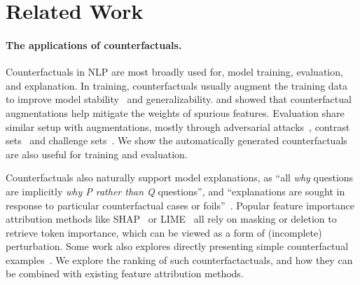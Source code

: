 \section{Related Work}
\label{sec:relate}

\paragraph{The applications of counterfactuals.}

Counterfactuals in NLP are most broadly used for, model training, evaluation, and explanation.
In training, counterfactuals usually augment the training data to improve model stability~\cite{Wu2019ConditionalBC, Wei2019EDAED, Kumar2020DataAU} and generalizability.
\citet{kaushik2019learning} and \citet{teney2020learning} showed that counterfactual augmentations help mitigate the weights of spurious features.
Evaluation share similar setup with augmentations, mostly through adversarial attacks~\cite{Song2020UniversalAA}, contrast sets~\cite{kaushik2019learning} and challenge sets~\cite{Geiger2019PosingFG, liu-etal-2019-inoculation}.
We show the automatically generated counterfactuals are also useful for training and evaluation.

Counterfactuals also naturally support model explanations, as ``all \emph{why} questions are implicitly \emph{why P rather than Q} questions'', and ``explanations are sought in response to particular counterfactual cases or foils''~\cite{miller}.
Popular feature importance attribution methods like SHAP~\cite{NIPS2017_7062} or LIME~\cite{Ribeiro2016WhySI} all rely on masking or deletion to retrieve token importance, which can be viewed as a form of (incomplete) perturbation.
Some work also explores directly presenting simple counterfactual examples~\cite{hase2020evaluating, vig2020causal, kang2020counterfactual}.
We explore the ranking of such counterfactactuals, and how they can be combined with existing feature attribution methods.

